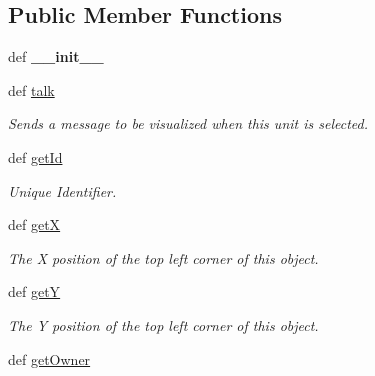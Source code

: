 \subsection*{Public Member Functions}
\begin{DoxyCompactItemize}
\item 
\hypertarget{classGameObject_1_1Unit_a29efd7d8ec0ee55b4cfd2a198c42eab5}{
def {\bfseries \_\-\_\-init\_\-\_\-}}
\label{classGameObject_1_1Unit_a29efd7d8ec0ee55b4cfd2a198c42eab5}

\item 
\hypertarget{classGameObject_1_1Unit_ab32e23a3a72c78ebae7270bba1f619b1}{
def \hyperlink{classGameObject_1_1Unit_ab32e23a3a72c78ebae7270bba1f619b1}{talk}}
\label{classGameObject_1_1Unit_ab32e23a3a72c78ebae7270bba1f619b1}

\begin{DoxyCompactList}\small\item\em Sends a message to be visualized when this unit is selected. \item\end{DoxyCompactList}\item 
\hypertarget{classGameObject_1_1Unit_ade3a9d46b4c71e305744a0ac4ea4bce5}{
def \hyperlink{classGameObject_1_1Unit_ade3a9d46b4c71e305744a0ac4ea4bce5}{getId}}
\label{classGameObject_1_1Unit_ade3a9d46b4c71e305744a0ac4ea4bce5}

\begin{DoxyCompactList}\small\item\em Unique Identifier. \item\end{DoxyCompactList}\item 
def \hyperlink{classGameObject_1_1Unit_a01711efd87c7e3e2a97066e9a5c50da5}{getX}
\begin{DoxyCompactList}\small\item\em The X position of the top left corner of this object. \item\end{DoxyCompactList}\item 
def \hyperlink{classGameObject_1_1Unit_a4d0c47deb0ddb19b9e2b195d8ca2f2ad}{getY}
\begin{DoxyCompactList}\small\item\em The Y position of the top left corner of this object. \item\end{DoxyCompactList}\item 
\hypertarget{classGameObject_1_1Unit_a492eeeaefbaada8b03c756d884c46978}{
def \hyperlink{classGameObject_1_1Unit_a492eeeaefbaada8b03c756d884c46978}{getOwner}}
\label{classGameObject_1_1Unit_a492eeeaefbaada8b03c756d884c46978}


\end{DoxyCompactItemize}
